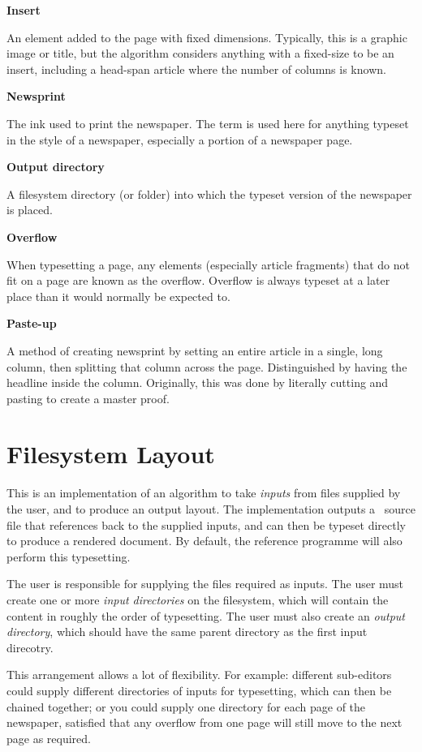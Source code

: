 \documentclass[a4paper,DIV=11]{scrartcl}
\newcommand{\deft}[2]{\nopagebreak\noindent\hspace{0.5in}\textbf{#1}\par\noindent{}#2\pagebreak[1]\par}
\begin{document}
\deft{Insert}{An element added to the page with fixed
  dimensions. Typically, this is a graphic image or title, but the
  algorithm considers anything with a fixed-size to be an insert,
  including a head-span article where the number of columns is known.}

\deft{Newsprint}{The ink used to print the newspaper. The term is used
  here for anything typeset in the style of a newspaper, especially a
  portion of a newspaper page.}

\deft{Output directory}{A filesystem directory (or folder) into which
  the typeset version of the newspaper is placed.}

\deft{Overflow}{When typesetting a page, any elements (especially
  article fragments) that do not fit on a page are known as the
  overflow. Overflow is always typeset at a later place than it would
  normally be expected to.}

\deft{Paste-up}{A method of creating newsprint by setting an entire
  article in a single, long column, then splitting that column across
  the page. Distinguished by having the headline inside the column.
  Originally, this was done by literally cutting and pasting
  to create a master proof.}


\section{Filesystem Layout}

This is an implementation of an algorithm to take \textit{inputs} from
files supplied by the user, and to produce an output layout. The
implementation outputs a \LaTeXe\ source file that references back to
the supplied inputs, and can then be typeset directly to produce a
rendered document. By default, the reference programme will also perform
this typesetting.

The user is responsible for supplying the files required as
inputs. The user must create one or more \textit{input directories} on
the filesystem, which will contain the content in roughly the order of
typesetting. The user must also create an \textit{output directory},
which should have the same parent directory as the first input
direcotry.

This arrangement allows a lot of flexibility. For example: different
sub-editors could supply different directories of inputs for
typesetting, which can then be chained together; or you could supply
one directory for each page of the newspaper, satisfied that any overflow
from one page will still move to the next page as required.
\end{document}
